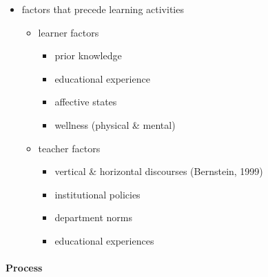 \documentclass[
]{book}
\providecommand{\tightlist}{%
  \setlength{\itemsep}{0pt}\setlength{\parskip}{0pt}}
\begin{document}
\begin{itemize}
\tightlist
\item
  factors that precede learning activities

  \begin{itemize}
  \tightlist
  \item
    learner factors

    \begin{itemize}
    \tightlist
    \item
      prior knowledge\\
    \item
      educational experience\\
    \item
      affective states\\
    \item
      wellness (physical \& mental)\\
    \end{itemize}
  \item
    teacher factors

    \begin{itemize}
    \tightlist
    \item
      vertical \& horizontal discourses (Bernstein, 1999)\\
    \item
      institutional policies\\
    \item
      department norms\\
    \item
      educational experiences
    \end{itemize}
  \end{itemize}
\end{itemize}

\hypertarget{process}{%
\paragraph*{Process}\label{process}}
\end{document}

